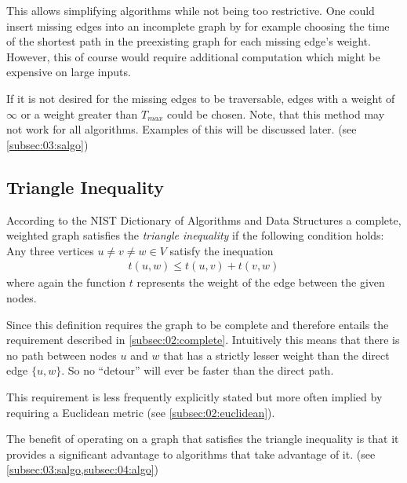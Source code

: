 This allows simplifying algorithms while not being too restrictive.
One could insert missing edges into an incomplete graph by for example choosing the time of the shortest path in the preexisting graph for each missing edge's weight.
However, this of course would require additional computation which might be expensive on large inputs.

If it is not desired for the missing edges to be traversable,
edges with a weight of $\infty$ or a weight greater than $T_{max}$ could be chosen.
Note, that this method may not work for all algorithms. Examples of this will be discussed later. (see \cref{subsec:03:salgo})

\subsection{Triangle Inequality}
\label{subsec:02:triangle}

According to the NIST Dictionary of Algorithms and Data Structures \cite{black_triangle_2004} a complete,
weighted graph satisfies the \emph{triangle inequality} if the following condition holds:
Any three vertices $u \neq v \neq w \in V$ satisfy the inequation
\begin{align*}
  t(u, w) \leq t(u, v) + t(v, w) 
\end{align*}
where again the function $t$ represents the weight of the edge between the given nodes.

Since this definition requires the graph to be complete and therefore entails the requirement described in \cref{subsec:02:complete}.
Intuitively this means that there is no path between nodes $u$ and $w$ that has a strictly lesser weight
than the direct edge $\{u, w\}$. So no \enquote{detour} will ever be faster than the direct path. 

This requirement is less frequently explicitly stated \cite{santini_hazardous_2022} but more often implied by requiring a Euclidean metric (see \cref{subsec:02:euclidean}).

The benefit of operating on a graph that satisfies the triangle inequality
is that it provides a significant advantage to algorithms that take advantage of it.
(see \cref{subsec:03:salgo,subsec:04:algo})

